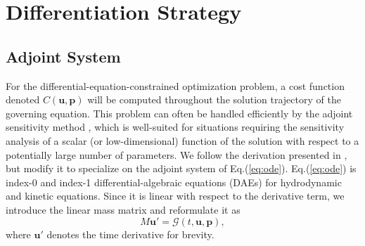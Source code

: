 \documentclass[preprint,3p,12pt,sort&compress]{elsarticle}
\begin{document}
\section{Differentiation Strategy}\label{sec:differentiation}

\subsection{Adjoint System}\label{sec:adjoint}

For the differential-equation-constrained optimization problem, a cost function denoted $C(\mathbf u,\mathbf p)$ will be computed throughout the solution trajectory of the governing equation.
This problem can often be handled efficiently by the adjoint sensitivity method \cite{errico1997adjoint}, which is well-suited for situations requiring the sensitivity analysis of a scalar (or low-dimensional) function of the solution with respect to a potentially large number of parameters.
We follow the derivation presented in \cite{cao2003adjoint}, but modify it to specialize on the adjoint system of Eq.(\ref{eq:ode}).
Eq.(\ref{eq:ode}) is index-0 and index-1 differential-algebraic equations (DAEs) for hydrodynamic and kinetic equations.
Since it is linear with respect to the derivative term, we introduce the linear mass matrix and reformulate it as
\begin{equation}
    M \mathbf u' = \mathcal G(t,\mathbf u,\mathbf p),
\end{equation}
where $\mathbf u'$ denotes the time derivative for brevity.
\end{document}
